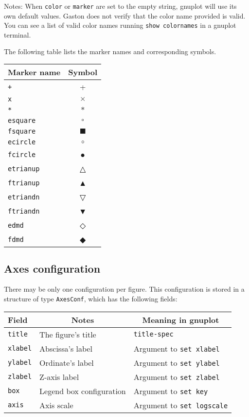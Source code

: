 \documentclass[11pt]{article}
\newcommand{\cmd}[1]{\texttt{#1}}
\begin{document}
Notes: When \cmd{color} or \cmd{marker} are set to the empty string, gnuplot will use
its own default values. Gaston does not verify that the color name provided is
valid. You can see a list of valid color names running \cmd{show colornames} in
a gnuplot terminal.

The following table lists the marker names and corresponding symbols.

{\small
\begin{center}
\begin{tabular}{lc}
	\toprule
	\textbf{Marker name} & \textbf{Symbol} \\
	\midrule
	\cmd{+} & + \\
	\cmd{x} & $\times$ \\
	\cmd{*} & $\ast$ \\
	\cmd{esquare} & $\square$ \\
	\cmd{fsquare} & $\blacksquare$ \\
	\cmd{ecircle} & $\circ$ \\
	\cmd{fcircle} & ● \\
	\cmd{etrianup} & △ \\
	\cmd{ftrianup} & ▲ \\
	\cmd{etriandn} & ▽ \\
	\cmd{ftriandn} & ▼ \\
	\cmd{edmd} & ◇ \\
	\cmd{fdmd} & ◆ \\
	\bottomrule
\end{tabular}
\end{center}}

\subsection{Axes configuration}

There may be only one configuration per figure. This configuration is stored in
a structure of type \cmd{AxesConf}, which has the following fields:

{\small
\begin{center}
\begin{tabular}{lll}
	\toprule
	\textbf{Field} & \multicolumn{1}{c}{\textbf{Notes}} &
	\multicolumn{1}{c}{\textbf{Meaning in gnuplot}} \\
	\midrule
	\cmd{title} & The figure's title & \cmd{title-spec} \\
	\cmd{xlabel} & Abscissa's label & Argument to \cmd{set xlabel} \\
	\cmd{ylabel} & Ordinate's label & Argument to \cmd{set ylabel} \\
	\cmd{zlabel} & Z-axis label & Argument to \cmd{set zlabel} \\
	\cmd{box} & Legend box configuration & Argument to \cmd{set key} \\
	\cmd{axis} & Axis scale & Argument to \cmd{set logscale} \\
	\bottomrule
\end{tabular}
\end{center}}
\end{document}

